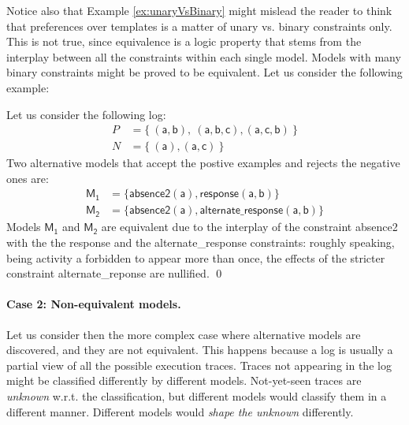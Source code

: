 Notice also that Example \ref{ex:unaryVsBinary} might mislead the reader to think that preferences over templates is a matter of unary vs. binary constraints only. This is not true, since equivalence is a logic property that stems from the interplay between all the constraints within each single model. Models with many binary constraints might be proved to be equivalent. Let us consider the following example:

\begin{example}
\label{ex:alternateVsResponseEquiv}
Let us consider the following log:
\begin{align*}
P & = \{\ (\mathsf{a}, \mathsf{b}),\ (\mathsf{a}, \mathsf{b}, \mathsf{c}),(\mathsf{a}, \mathsf{c}, \mathsf{b})\ \} \\
N & = \{\ (\mathsf{a}), (\mathsf{a}, \mathsf{c})\ \}
\end{align*}
%
Two alternative models that accept the postive examples and rejects the negative ones are:
\begin{align*}
\mathsf{M_1} & = \{ \mathsf{absence2(a),response(a,b)}\} \\
\mathsf{M_2} & = \{ \mathsf{absence2(a),alternate\_response(a, b)}\}
\end{align*}
Models $\mathsf{M_1}$ and $\mathsf{M_2}$ are equivalent due to the interplay of the constraint \textsf{absence2} with the the \textsf{response} and the \textsf{alternate\_response} constraints: roughly speaking, being activity \textsf{a} forbidden to appear more than once, the effects of the stricter constraint \textsf{alternate\_reponse} are nullified.
\qed
\end{example}



\paragraph{Case 2: Non-equivalent models.}
Let us consider then the more complex case where alternative models are discovered, and they are not equivalent. This happens because a log is usually a partial view of all the possible execution traces. Traces not appearing in the log might be classified differently by different models. Not-yet-seen traces are \emph{unknown} w.r.t. the classification, but different models would classify them in a different manner. Different models would \emph{shape the unknown} differently.

